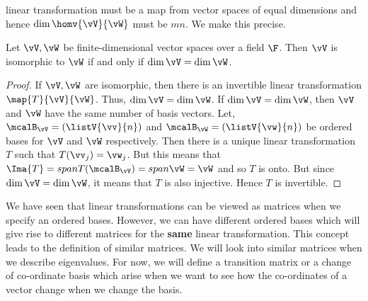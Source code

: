 linear transformation must be a map from vector spaces of equal dimensions and hence $\dim{\homv{\vV}{\vW}}$
must be $mn$. We make this precise.
\begin{Proposition}
    Let $\vV,\vW$ be finite-dimensional vector spaces over a field $\F$. Then $\vV$ is isomorphic to $\vW$ if
    and only if $\dim{\vV} = \dim{\vW}$.
\end{Proposition}
\begin{proof}
    If $\vV,\vW$ are isomorphic, then there is an invertible linear transformation $\map{T}{\vV}{\vW}$. Thus,
    $\dim{\vV} = \dim{\vW}$.
    If $\dim{\vV} = \dim{\vW}$, then $\vV$ and $\vW$ have the same number of basis vectors. Let,
    $\mcalB_{\vV} = \left(\listV{\vv}{n}\right)$ and 
    $\mcalB_{\vW} = \left(\listV{\vw}{n}\right)$ be ordered bases for $\vV$ and $\vW$ respectively. Then there
    is a unique linear transformation $T$ such that $T(\vv_{j}) = \vw_{j}$. But this means that
    $\Ima{T} = span{T(\mcalB_{\vV})} = span{\vW} = \vW$ and so $T$ is onto. But since $\dim{\vV} = \dim{\vW}$, it
    means that $T$ is also injective. Hence $T$ is invertible.
\end{proof}

We have seen that linear transformations can be viewed as matrices when we specify an ordered bases. However,
we can have different ordered bases which will give rise to different matrices for the \textbf{same} linear
transformation. This concept leads to the definition of similar matrices. We will look into similar matrices
when we describe eigenvalues. For now, we will define a transition matrix or a change of co-ordinate basis
which arise when we want to see how the co-ordinates of a vector change when we change the basis.

\endinput

